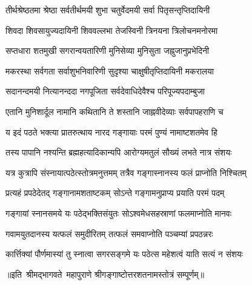 \twolineshloka
{तीर्थश्रेष्ठतमा श्रेष्ठा सर्वतीर्थमयी शुभा}
{चतुर्वेदमयी सर्वा पितृसन्तृप्तिदायिनी}

\twolineshloka
{शिवदा शिवसायुज्यदायिनी शिववल्लभा}
{तेजस्विनी त्रिनयना त्रिलोचनमनोरमा}

\twolineshloka
{सप्तधारा शतमुखी सगरान्वयतारिणी}
{मुनिसेव्या मुनिसुता जह्नुजानुप्रभेदिनी}

\twolineshloka
{मकरस्था सर्वगता सर्वाशुभनिवारिणी}
{सुदृश्या चाक्षुषीतृप्तिदायिनी मकरालया}

\twolineshloka
{सदानन्दमयी नित्यानन्ददा नगपूजिता}
{सर्वदेवाधिदेवैश्च परिपूज्यपदाम्बुजा}

\twolineshloka
{एतानि मुनिशार्दूल नामानि कथितानि ते}
{शस्तानि जाह्नवीदेव्याः सर्वपापहराणि च}

\twolineshloka
{य इदं पठते भक्त्या प्रातरुत्थाय नारद}
{गङ्गायाः परमं पुण्यं नामाष्टशतमेव हि}

\twolineshloka
{तस्य पापानि नश्यन्ति ब्रह्महत्यादिकान्यपि}
{आरोग्यमतुलं सौख्यं लभते नात्र संशयः}

\twolineshloka
{यत्र कुत्रापि संस्नायात्पठेत्स्तोत्रमनुत्तमम्}
{तत्रैव गङ्गास्नानस्य फलं प्राप्नोति निश्चितम्}

\twolineshloka
{प्रत्यहं प्रपठेदेतद् गङ्गानामशताष्टकम्}
{सोऽन्ते गङ्गामनुप्राप्य प्रयाति परमं पदम्}

\twolineshloka
{गङ्गायां स्नानसमये यः पठेद्भक्तिसंयुतः}
{सोऽश्वमेधसहस्राणां फलमाप्नोति मानवः}

\twolineshloka
{गवामयुतदानस्य यत्फलं समुदीरितम्}
{तत्फलं समवाप्नोति पञ्चम्यां प्रपठन्नरः}

\twolineshloka
{कार्त्तिक्यां पौर्णमास्यां तु स्नात्वा सगरसङ्गमे}
{यः पठेत्स महेशत्वं याति सत्यं न संशयः}

{॥इति~श्रीमद्भागवते~महापुराणे श्रीगङ्गाष्टोत्तरशतनामस्तोत्रं सम्पूर्णम्॥}
\closesection